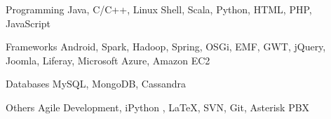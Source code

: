

\begin{cvskills}

  \cvskill
    {Programming} %
    {Java, C/C++, Linux Shell, Scala, Python, HTML, PHP, JavaScript} %

  \cvskill
    {Frameworks} %
    {Android, Spark, Hadoop, Spring, OSGi, EMF, GWT, jQuery, Joomla, Liferay, Microsoft Azure, Amazon EC2} %

  \cvskill
    {Databases} %
    {MySQL, MongoDB, Cassandra} %


  \cvskill
  {Others} %
  {Agile Development, iPython , {\LaTeX}, SVN, Git, Asterisk PBX} %
  
\end{cvskills}


